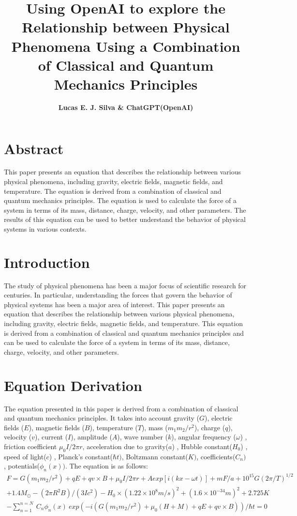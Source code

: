 \documentclass[12pt]{article}
\title{\textbf{Using OpenAI to explore the Relationship between Physical Phenomena Using a Combination of Classical and Quantum Mechanics Principles}}
\author{\textbf{Lucas E. J. Silva \& ChatGPT(OpenAI)}}
\begin{document}
 

    \maketitle

    \section*{Abstract}

    This paper presents an equation that describes the relationship between various physical phenomena, 
  including gravity, electric fields, magnetic fields, and temperature. The equation is derived from a combination 
  of classical and quantum mechanics principles. The equation is used to calculate the force of a system in terms 
  of its mass, distance, charge, velocity, and other parameters. The results of this equation can be used to better 
  understand the behavior of physical systems in various contexts. 

    \section*{Introduction}

    The study of physical phenomena has been a major focus of scientific research for centuries. 
  In particular, understanding the forces that govern the behavior of physical systems has been a major 
  area of interest. This paper presents an equation that describes the relationship between various physical 
  phenomena, including gravity, electric fields, magnetic fields, and temperature. This equation is derived 
  from a combination of classical and quantum mechanics principles and can be used to calculate the force of 
  a system in terms of its mass, distance, charge, velocity, and other parameters. 

    \section{Equation Derivation} 
    The equation presented in this paper is derived from a combination of classical and quantum mechanics 
  principles. It takes into account gravity ($G$), electric fields ($E$), magnetic fields ($B$), temperature ($T$), 
  mass ($m_1m_2/r^2$), charge ($q$), velocity ($v$), current ($I$), amplitude ($A$), wave number ($k$), angular 
  frequency ($\omega$) , friction coefficient $\mu_0I/2\pi r$, acceleration due to gravity($a$) , Hubble 
  constant($H_0$) , speed of light($c$) , Planck's constant($\hbar t)$, Boltzmann constant($K)$, coefficients($C_n)$, 
  potentials($\phi_n(x))$. 
  The equation is as follows:
  \begin{multline*}
  F = G(m_1m_2/r^2) + qE + qv \times B + \mu_0I/2\pi r + Aexp[i(kx-\omega t)] + mF/a + 10^{15} G (2\pi/T)^{1/2} \\
  + 1.4M_{\odot} - (2\pi R^2B)/(3Ic^2) - H_0 \times (1.22 \times 10^8 m/s)^2 + (1.6 \times 10^{-34} m)^2 + 2.725 K \\
  - \sum_{n=1}^{n=N}\ C_n \phi_n(x)\ exp(-i(G(m_{1}m_{2}/r^2)+ \mu_{0}(H+M)+ qE+ qv \times B))/{\hbar t = 0}
   \end{multline*}
\end{document}
